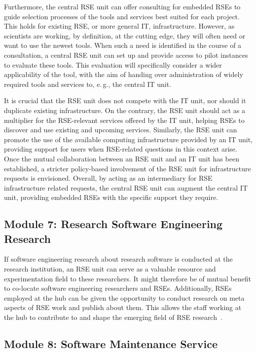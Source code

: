 \documentclass[a4paper]{article}
\newcommand*{\eg}{e.\,g.,\xspace}
\begin{document}
Furthermore, the central RSE unit can offer consulting for embedded RSEs to guide selection processes of the tools and services best suited for each project.
This holds for existing RSE, or more general IT, infrastructure.
However, as scientists are working, by definition, at the cutting edge, they will often need or want to use the newest tools.
When such a need is identified in the course of a consultation, a central RSE unit can set up and provide access to pilot instances to evaluate these tools.
This evaluation will specifically consider a wider applicability of the tool, with the aim of handing over administration of widely required tools and services to, \eg{} the central IT unit.

It is crucial that the RSE unit does not compete with the IT unit, nor should it duplicate existing infrastructure.
On the contrary, the RSE unit should act as a multiplier for the RSE-relevant services offered by the IT unit, helping RSEs to discover and use existing and upcoming services.
Similarly, the RSE unit can promote the use of the available computing infrastructure provided by an IT unit, providing support for users when RSE-related questions in this context arise.
Once the mutual collaboration between an RSE unit and an IT unit has been established, a stricter policy-based involvement of the RSE unit for infrastructure requests is envisioned.
Overall, by acting as an intermediary for RSE infrastructure related requests, the central RSE unit can augment the central IT unit, providing embedded RSEs with the specific support they require.

\subsection{Module 7: Research Software Engineering Research}%
\label{sec:rseresearch}

If software engineering research about research software is conducted at the research institution, an RSE unit can serve as a valuable resource and experimentation field to these researchers.
It might therefore be of mutual benefit to co-locate software engineering researchers and RSEs.
Additionally, RSEs employed at the hub can be given the opportunity to conduct research on meta aspects of RSE work and publish about them.
This allows the staff working at the hub to contribute to and shape the emerging field of RSE research~\autocite{Felderer_2025}.

\subsection{Module 8: Software Maintenance Service}%
\label{sec:maintenance}
\end{document}
